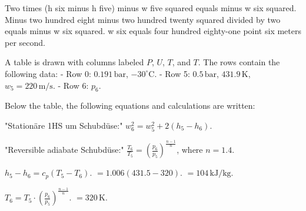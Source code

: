 Two times (h six minus h five) minus w five squared equals minus w six squared.  
Minus two hundred eight minus two hundred twenty squared divided by two equals minus w six squared.  
w six equals four hundred eighty-one point six meters per second.

A table is drawn with columns labeled \( P \), \( U \), \( T \), and \( T \). The rows contain the following data:  
- Row 0: \( 0.191 \, \text{bar} \), \( -30^\circ \text{C} \).  
- Row 5: \( 0.5 \, \text{bar} \), \( 431.9 \, \text{K} \), \( w_5 = 220 \, \text{m/s} \).  
- Row 6: \( p_6 \).  

Below the table, the following equations and calculations are written:  

"Stationäre 1HS um Schubdüse:"  
\( w_6^2 = w_5^2 + 2(h_5 - h_6) \).  

"Reversible adiabate Schubdüse:"  
\( \frac{T_6}{T_5} = \left( \frac{p_6}{p_5} \right)^{\frac{n-1}{n}} \), where \( n = 1.4 \).  

\( h_5 - h_6 = c_p(T_5 - T_6) \).  
\( = 1.006 (431.5 - 320) \).  
\( = 104 \, \text{kJ/kg} \).  

\( T_6 = T_5 \cdot \left( \frac{p_6}{p_5} \right)^{\frac{n-1}{n}} \).  
\( = 320 \, \text{K} \).